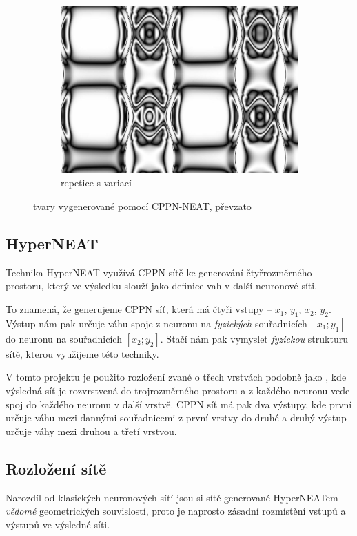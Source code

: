 \documentclass[a4]{article}
\begin{document}
\begin{figure}
\begin{subfigure}[b]{0.3\textwidth}
        \includegraphics[width=\textwidth]{cppn3}
        \caption{repetice s variací}
        \label{fig:repvar}
    \end{subfigure}
    \caption{tvary vygenerované pomocí CPPN-NEAT, převzato\cite{hyperneat}}\label{fig:cppn}
\end{figure}
\subsection{HyperNEAT}
Technika HyperNEAT\cite{hyperneat} využívá CPPN sítě ke generování čtyřrozměrného prostoru, který ve výsledku slouží jako definice vah v další neuronové síti.\par
To znamená, že generujeme CPPN síť, která má čtyři vstupy -- $x_1$, $y_1$, $x_2$, $y_2$. Výstup nám pak určuje váhu spoje z neuronu na \emph{fyzických} souřadnicích $[x_1;y_1]$ do neuronu na souřadnicích $[x_2;y_2]$. Stačí nám pak vymyslet \emph{fyzickou} strukturu sítě, kterou využijeme této techniky.\par
V tomto projektu je použito rozložení zvané \emph{}\cite{hyperneat} o třech vrstvách podobně jako \cite{clunegait}, kde výsledná síť je rozvrstvená do trojrozměrného prostoru a z každého neuronu vede spoj do každého neuronu v další vrstvě. CPPN síť má pak dva výstupy, kde první určuje váhu mezi dannými souřadnicemi z první vrstvy do druhé a druhý výstup určuje váhy mezi druhou a třetí vrstvou.\par
\subsection{Rozložení sítě}
Narozdíl od klasických neuronových sítí jsou si sítě generované HyperNEATem \emph{vědomé} geometrických souvislostí\cite{hyperneat}, proto je naprosto zásadní rozmístění vstupů a výstupů ve výsledné síti.\par
\end{document}
